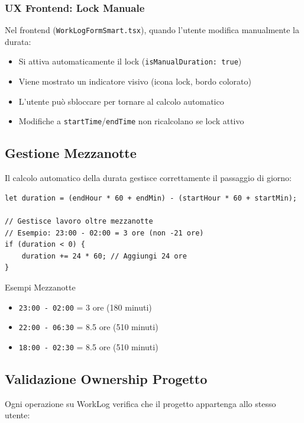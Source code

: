 \documentclass[11pt,a4paper]{article}
\begin{document}
\subsubsection{UX Frontend: Lock Manuale}

Nel frontend (\texttt{WorkLogFormSmart.tsx}), quando l'utente modifica manualmente la durata:
\begin{itemize}
    \item Si attiva automaticamente il lock (\texttt{isManualDuration: true})
    \item Viene mostrato un indicatore visivo (icona lock, bordo colorato)
    \item L'utente può sbloccare per tornare al calcolo automatico
    \item Modifiche a \texttt{startTime}/\texttt{endTime} non ricalcolano se lock attivo
\end{itemize}

\subsection{Gestione Mezzanotte}

Il calcolo automatico della durata gestisce correttamente il passaggio di giorno:

\begin{lstlisting}[caption=Calcolo Durata con Mezzanotte]
let duration = (endHour * 60 + endMin) - (startHour * 60 + startMin);

// Gestisce lavoro oltre mezzanotte
// Esempio: 23:00 - 02:00 = 3 ore (non -21 ore)
if (duration < 0) {
    duration += 24 * 60; // Aggiungi 24 ore
}
\end{lstlisting}

\begin{tipbox}{Esempi Mezzanotte}
\begin{itemize}
    \item \texttt{23:00 - 02:00} = 3 ore (180 minuti)
    \item \texttt{22:00 - 06:30} = 8.5 ore (510 minuti)
    \item \texttt{18:00 - 02:30} = 8.5 ore (510 minuti)
\end{itemize}
\end{tipbox}

\subsection{Validazione Ownership Progetto}

Ogni operazione su WorkLog verifica che il progetto appartenga allo stesso utente:
\end{document}

